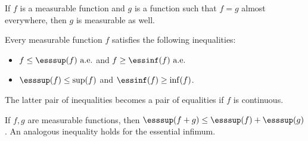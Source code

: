     \begin{property}
        If $f$ is a measurable function and $g$ is a function such that $f=g$ almost everywhere, then $g$ is measurable as well.
    \end{property}

    \begin{property}
        Every measurable function $f$ satisfies the following inequalities:
        \begin{itemize}
            \item $f\leq\esssup(f)\text{ a.e.}$ and $f\geq\essinf(f)\text{ a.e.}$
            \item $\esssup(f)\leq\sup(f)$ and $\essinf(f)\geq\inf(f)$.
        \end{itemize}
        The latter pair of inequalities becomes a pair of equalities if $f$ is continuous.
    \end{property}
    \begin{property}
        If $f,g$ are measurable functions, then $\esssup(f+g)\leq\esssup(f) + \esssup(g)$. An analogous inequality holds for the essential infimum.
    \end{property}